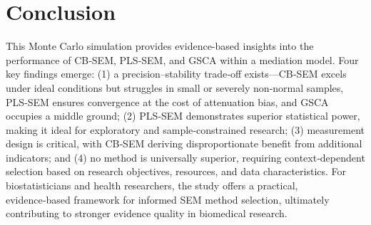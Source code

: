 \documentclass[twoside]{article}
\begin{document}
\vspace{-1\baselineskip}
\section{Conclusion}
This Monte Carlo simulation provides evidence-based insights into the performance of CB‑SEM, PLS‑SEM, and GSCA within a mediation model. Four key findings emerge: (1) a precision–stability trade‑off exists—CB‑SEM excels under ideal conditions but struggles in small or severely non‑normal samples, PLS‑SEM ensures convergence at the cost of attenuation bias, and GSCA occupies a middle ground; (2) PLS‑SEM demonstrates superior statistical power, making it ideal for exploratory and sample‑constrained research; (3) measurement design is critical, with CB‑SEM deriving disproportionate benefit from additional indicators; and (4) no method is universally superior, requiring context‑dependent selection based on research objectives, resources, and data characteristics. For biostatisticians and health researchers, the study offers a practical, evidence‑based framework for informed SEM method selection, ultimately contributing to stronger evidence quality in biomedical research.
\vspace{-1\baselineskip}
\end{document}
